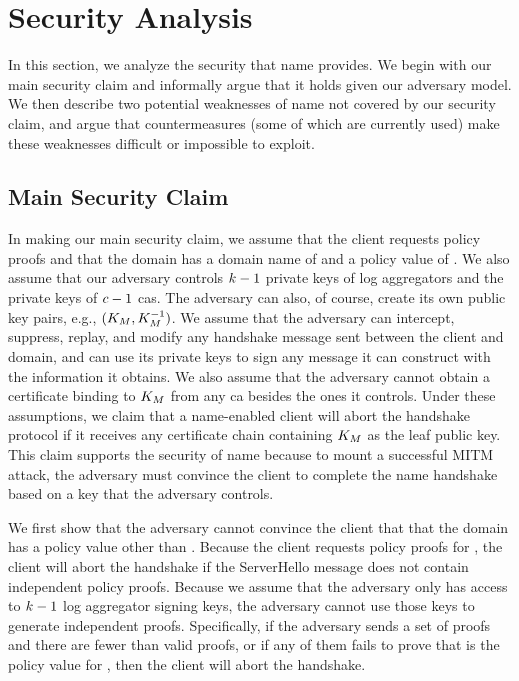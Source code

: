 \section{Security Analysis}
\label{sec:analysis}

In this section, we analyze the security that \ac{name} provides. We begin with
our main security claim and informally argue that it holds given our adversary
model. We then describe two potential weaknesses of \ac{name} not covered by our
security claim, and argue that countermeasures (some of which are currently
used) make these weaknesses difficult or impossible to exploit.


\subsection{Main Security Claim}
\label{sec:analysis:informal}

In making our main security claim, we assume that the client requests \numlas
policy proofs and that the domain has a domain name of \domain and a policy
value of \policy. 
We also assume that our adversary controls $k - 1$
private keys of log aggregators and the private keys of $c - 1$ \acp{ca}.
The adversary can also, of course, create its own public key pairs, e.g., 
$(K_M, K_M^{-1})$.
We assume that the adversary
can intercept, suppress, replay, and modify any handshake message sent between
the client and domain, and can use its private keys to 
sign any message it can construct with the
information it obtains. We also assume that the adversary
cannot obtain a certificate binding \domain to $K_M$ from any \ac{ca}
besides the ones it controls. Under these assumptions, we claim that a \ac{name}-enabled client
will abort the handshake protocol if it receives any certificate chain
containing $K_M$ as the leaf public key. This claim 
supports the security of \ac{name} because to mount a successful MITM attack,
the adversary must convince the client to complete the \ac{name} handshake
based on a key that the adversary controls.

We first show that the adversary cannot convince the client that that the domain
has a policy value other than \policy. Because the client requests \numlas
policy proofs for \domain, the client will abort the handshake if the 
ServerHello message does not contain \numlas independent policy
proofs. Because we assume that the adversary only has access to $k - 1$
log aggregator signing keys, the adversary cannot use those keys to
generate \numlas independent proofs. Specifically, if the adversary sends a set
of proofs and there are fewer than \numlas valid proofs, or if any of them fails
to prove that \policy is the policy value for \domain, then the client will
abort the handshake.

